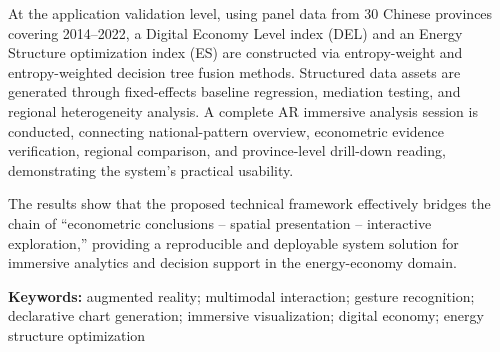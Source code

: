 At the application validation level, using panel data from 30 Chinese provinces covering 2014--2022, a Digital Economy Level index (DEL) and an Energy Structure optimization index (ES) are constructed via entropy-weight and entropy-weighted decision tree fusion methods. Structured data assets are generated through fixed-effects baseline regression, mediation testing, and regional heterogeneity analysis. A complete AR immersive analysis session is conducted, connecting national-pattern overview, econometric evidence verification, regional comparison, and province-level drill-down reading, demonstrating the system's practical usability.

The results show that the proposed technical framework effectively bridges the chain of “econometric conclusions -- spatial presentation -- interactive exploration,” providing a reproducible and deployable system solution for immersive analytics and decision support in the energy-economy domain.

\textbf{Keywords:} augmented reality; multimodal interaction; gesture recognition; declarative chart generation; immersive visualization; digital economy; energy structure optimization